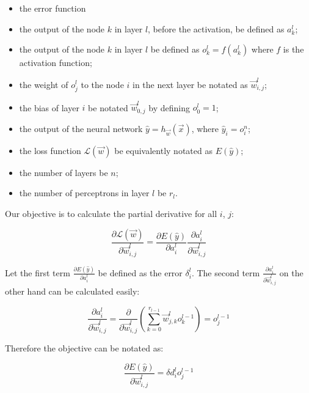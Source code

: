 \documentclass[12pt,a4paper,]{report}
\providecommand{\tightlist}{%
  \setlength{\itemsep}{0pt}\setlength{\parskip}{0pt}}
\begin{document}
\begin{itemize}
\tightlist
\item
  the error function
\item
  the output of the node \(k\) in layer \(l\), before the activation, be
  defined as \(a^l_k\);
\item
  the output of the node \(k\) in layer \(l\) be defined as
  \(o^l_k = f(a^l_k)\) where \(f\) is the activation function;
\item
  the weight of \(o^l_j\) to the node \(i\) in the next layer be notated
  as \(\vec{w}^l_{i, j}\);
\item
  the bias of layer \(i\) be notated \(\vec{w}^l_{0,j}\) by defining
  \(o^l_0 = 1\);
\item
  the output of the neural network \(\hat{y} = h_{\vec{w}}(\vec{x})\),
  where \(\hat{y}_i = o^n_i\);
\item
  the loss function \(\mathcal{L}(\vec{w})\) be equivalently notated as
  \(E(\hat{y})\);
\item
  the number of layers be \(n\);
\item
  the number of perceptrons in layer \(l\) be \(r_l\).
\end{itemize}

Our objective is to calculate the partial derivative for all \(i\),
\(j\):

\begin{equation}
    \frac{\partial \mathcal{L}(\vec{w})}{\partial \vec{w}^l_{i, j}} = \frac{\partial E(\hat{y})}{\partial a^l_i} \frac{\partial a^l_i}{\partial \vec{w}^l_{i, j}}
\end{equation}

Let the first term \(\frac{\partial E(\hat{y})}{\partial a^l_i}\) be
defined as the error \(\delta^l_i\). The second term
\(\frac{\partial a^l_i}{\partial \vec{w}^l_{i, j}}\) on the other hand
can be calculated easily:

\begin{equation}
    \frac{\partial a^l_i}{\partial \vec{w}^l_{i, j}} 
    = \frac{\partial}{\partial \vec{w}^l_{i, j}} (\sum_{k=0}^{r_{l-1}} \vec{w}^{l}_{j, k} o^{l-1}_k)
    = o^{l-1}_j
\end{equation}

Therefore the objective can be notated as:

\begin{equation}
\frac{\partial E(\hat{y})}{\partial \vec{w}^l_{i, j}} = \delta{d^l_i} o^{l-1}_j \label{eq:grad}
\end{equation}
\end{document}
